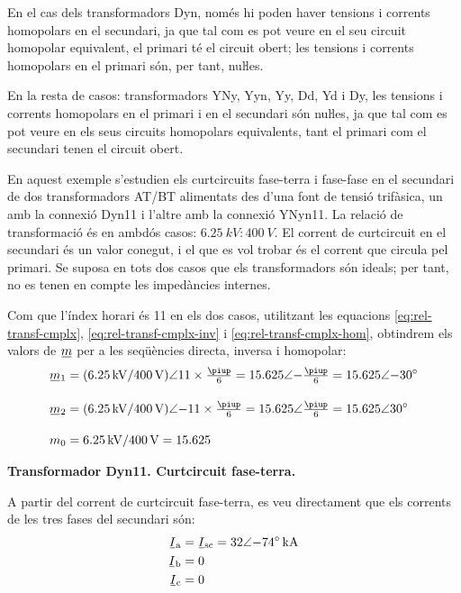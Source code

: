 En el cas dels transformadors Dyn, només hi poden haver tensions i corrents homopolars en el secundari, ja que tal com es pot veure en el seu circuit homopolar equivalent, el primari té el circuit obert; les tensions i corrents homopolars en el primari són, per tant, nuŀles.

En la resta de casos: transformadors YNy, Yyn, Yy, Dd, Yd i Dy, les tensions i corrents homopolars en el primari i en el secundari són  nuŀles, ja que tal com es pot veure en els seus circuits homopolars equivalents, tant el primari com el secundari tenen el circuit obert.


	
\begin{exemple}[\CCasimSecTrafo{}]
	\addcontentsxms{\CCasimSecTrafo}
    En aquest exemple s'estudien els curtcircuits fase-terra i fase-fase en el secundari de dos transformadors AT/BT alimentats des d'una font de tensió trifàsica, un amb la connexió Dyn11 i l'altre amb la connexió YNyn11. La relació de transformació és en ambdós casos: $\qty{6,25}{kV}\!:\!\qty{400}{V}$. El corrent de curtcircuit en el secundari és un valor conegut, i el que es vol trobar és el corrent que circula pel primari. Se suposa en tots dos casos que els transformadors són ideals; per tant, no es tenen en compte les impedàncies internes.


    Com que l'índex horari és 11 en els dos casos, utilitzant les equacions \eqref{eq:rel-transf-cmplx}, \eqref{eq:rel-transf-cmplx-inv} i \eqref{eq:rel-transf-cmplx-hom}, obtindrem els valors de $\cmplx{m}$ per a les seqüències directa, inversa i homopolar:
    \begin{align*}
        \cmplx{m}_1 &= (\qty{6,25}{kV} / \qty{400}{V})\angle 11\times\tfrac{\piup}{6} =
        \num{15,625}\angle{-\tfrac{\piup}{6}} = \complexnum{15,625:-30} \\[1em]
        \cmplx{m}_2 &= (\qty{6,25}{kV} / \qty{400}{V})\angle {-11}\times\tfrac{\piup}{6} =
        \num{15,625}\angle \tfrac{\piup}{6} =\complexnum{15,625:30}  \\[1em]
        m_0 &= \qty{6,25}{kV} / \qty{400}{V} = \num{15,625}
    \end{align*}

	\break
   \textbf{ Transformador Dyn11. Curtcircuit fase-terra.}

    \begin{center}
       
    \end{center}

    A partir del corrent de curtcircuit fase-terra, es veu directament que els corrents de les tres fases del secundari són:
    \begin{align*}
        \cmplx{I}\ped{a} &= \cmplx{I}\ped{sc} = \complexqty{32:-74}{kA} \\
        \cmplx{I}\ped{b} &= 0  \\
        \cmplx{I}\ped{c} &= 0
    \end{align*}


\end{exemple}
